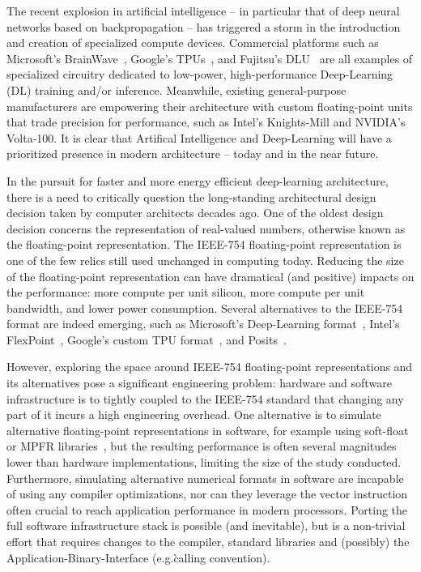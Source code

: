 \documentclass[techrep,english]{ipsj}
\begin{document}
The recent explosion in artificial intelligence – in particular that of deep neural networks based on backpropagation – has triggered a storm in the introduction and creation of specialized compute devices. Commercial platforms such as Microsoft’s BrainWave~\cite{msbrainwave}, Google’s TPUs~\cite{googletpu}, and Fujitsu’s DLU~\cite{fujitsudlu} are all examples of specialized circuitry dedicated to low-power, high-performance Deep-Learning (DL) training and/or inference. Meanwhile, existing general-purpose manufacturers are empowering their architecture with custom floating-point units that trade precision for performance, such as Intel’s Knights-Mill\`\cite{knm} and NVIDIA’s Volta-100\`\cite{volta100}. It is clear that Artifical Intelligence and Deep-Learning will have a prioritized presence in modern architecture -- today and in the near future.

In the pursuit for faster and more energy efficient deep-learning architecture, there is a need to critically question the long-standing architectural design decision taken by computer architects decades ago. One of the oldest design decision concerns the representation of real-valued numbers, otherwise known as the floating-point representation. The IEEE-754 floating-point representation is one of the few relics still used unchanged in computing today. Reducing the size of the floating-point representation can have dramatical (and positive) impacts on the performance: more compute per unit silicon, more compute per unit bandwidth, and lower power consumption. Several alternatives to the IEEE-754 format are indeed emerging, such as Microsoft’s Deep-Learning format~\cite{msbrainwave}, Intel’s FlexPoint~\cite{intelflexpoint}, Google’s custom TPU format~\cite{tpuformat}, and Posits~\cite{posits}.

However, exploring the space around IEEE-754 floating-point representations and its alternatives pose a significant engineering problem: hardware and software infrastructure is to tightly coupled to the IEEE-754 standard that changing any part of it incurs a high engineering overhead.
One alternative is to simulate alternative floating-point representations in software, for example using soft-float or MPFR libraries~\cite{softfloat}, but the resulting performance is often several magnitudes lower than hardware implementations, limiting the size of the study conducted. Furthermore, simulating alternative numerical formats in software are incapable of using any compiler optimizations, nor can they leverage the vector instruction often crucial to reach application performance in modern processors. Porting the full software infrastructure stack is possible (and inevitable), but is a non-trivial effort that requires changes to the compiler, standard libraries and (possibly) the Application-Binary-Interface (e.g.\`calling convention).
\end{document}
